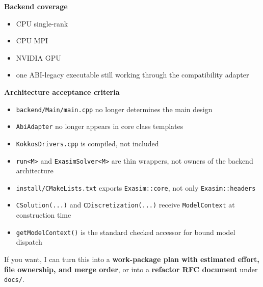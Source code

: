 \documentclass[11pt]{article}
\begin{document}
\textbf{Backend coverage}
\begin{itemize}[leftmargin=*]
\item CPU single-rank
\item CPU MPI
\item NVIDIA GPU
\item one ABI-legacy executable still working through the compatibility adapter
\end{itemize}

\textbf{Architecture acceptance criteria}
\begin{itemize}[leftmargin=*]
\item \texttt{backend/Main/main.cpp} no longer determines the main design
\item \texttt{AbiAdapter} no longer appears in core class templates
\item \texttt{KokkosDrivers.cpp} is compiled, not included
\item \texttt{run<M>} and \texttt{ExasimSolver<M>} are thin wrappers, not owners of the backend architecture
\item \texttt{install/CMakeLists.txt} exports \texttt{Exasim::core}, not only \texttt{Exasim::headers}
\item \texttt{CSolution(...)} and \texttt{CDiscretization(...)} receive \texttt{ModelContext} at construction time
\item \texttt{getModelContext()} is the standard checked accessor for bound model dispatch
\end{itemize}

If you want, I can turn this into a \textbf{work-package plan with estimated effort, file ownership, and merge order}, or into a \textbf{refactor RFC document} under \texttt{docs/}.
\end{document}
